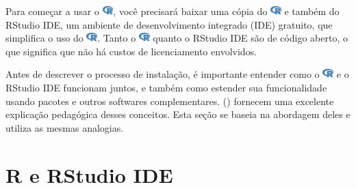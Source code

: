 \documentclass[
  letterpaper,
]{book}
\theoremstyle{plain}
\theoremstyle{definition}
\theoremstyle{remark}
\begin{document}
Para começar a usar o
\includegraphics[width=1.13em,height=1em]{getting_started_with_r_files/figure-pdf/fa-icon-9b00320707d42527dde67262afb33ded.pdf},
você precisará baixar uma cópia do
\includegraphics[width=1.13em,height=1em]{getting_started_with_r_files/figure-pdf/fa-icon-9b00320707d42527dde67262afb33ded.pdf}
e também do RStudio IDE, um ambiente de desenvolvimento integrado (IDE)
gratuito, que simplifica o uso do
\includegraphics[width=1.13em,height=1em]{getting_started_with_r_files/figure-pdf/fa-icon-9b00320707d42527dde67262afb33ded.pdf}.
Tanto o
\includegraphics[width=1.13em,height=1em]{getting_started_with_r_files/figure-pdf/fa-icon-9b00320707d42527dde67262afb33ded.pdf}
quanto o RStudio IDE são de código aberto, o que significa que não há
custos de licenciamento envolvidos.

Antes de descrever o processo de instalação, é importante entender como
o
\includegraphics[width=1.13em,height=1em]{getting_started_with_r_files/figure-pdf/fa-icon-9b00320707d42527dde67262afb33ded.pdf}
e o RStudio IDE funcionam juntos, e também como estender sua
funcionalidade usando pacotes e outros softwares complementares.
()
fornecem uma excelente explicação pedagógica desses conceitos. Esta
seção se baseia na abordagem deles e utiliza as mesmas analogias.

\section{R e RStudio IDE}\label{r-e-rstudio-ide}
\end{document}
